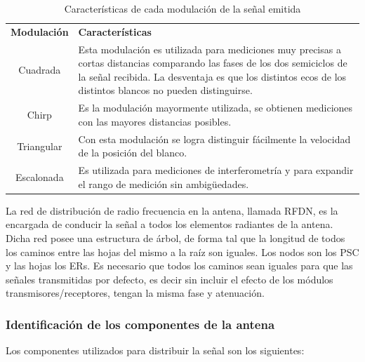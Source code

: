\begin{table}[H]
  \footnotesize
  \centering
  \begin{tabular}{|c|p{9cm}|}
	\hline
	\textbf{Modulación} & \textbf{Características} \\
	Cuadrada & Esta modulación es utilizada para mediciones muy precisas a cortas distancias comparando las fases de los dos
	semiciclos de la señal recibida. La desventaja es que los distintos ecos de los distintos blancos no pueden distinguirse.\\\hline
	Chirp & Es la modulación mayormente utilizada, se obtienen mediciones con las mayores distancias posibles.\\\hline
	Triangular & Con esta modulación se logra distinguir fácilmente la velocidad de la posición del blanco. \\\hline
	Escalonada & Es utilizada para mediciones de interferometría y para expandir el rango de medición sin ambig\"uedades.\\\hline
  \end{tabular}
  \caption{Características de cada modulación de la señal emitida}
  \label{tab:modulations}
\end{table}

La red de distribución de radio frecuencia en la antena, llamada RFDN, es la encargada de conducir la señal a todos los 
elementos radiantes de la antena. Dicha red posee una estructura de árbol, de forma tal que la longitud de todos los caminos
entre las hojas del mismo a la raíz son iguales. Los nodos son los PSC y las hojas los ERs. Es necesario que todos los caminos
sean iguales para que las señales transmitidas por defecto, es decir sin incluir el efecto de los módulos 
transmisores/receptores, tengan la misma fase y atenuación. 


\subsubsection{Identificación de los componentes de la antena}

Los componentes utilizados para distribuir la señal son los siguientes:

